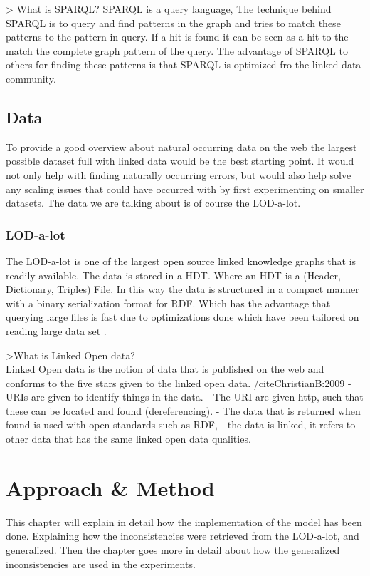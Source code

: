 \documentclass{article}
\begin{document}
> What is SPARQL?
SPARQL is a query language, The technique behind SPARQL is to query and find patterns in the graph and tries to match these patterns to the pattern in query. If a hit is found it can be seen as a hit to the match the complete graph pattern of the query. The advantage of SPARQL to others for finding these patterns is that SPARQL is optimized fro the linked data community.  \cite{SPARQLPrimer:2013}


\subsection{Data}
To provide a good overview about natural occurring data on the web the largest possible dataset full with linked data would be the best starting point. It would not only help with finding naturally occurring errors, but would also help solve any scaling issues that could have occurred with by first experimenting on smaller datasets. The data we are talking about is of course the LOD-a-lot.

\subsubsection{LOD-a-lot}
The LOD-a-lot \cite{JavierD:2017} is one of the largest open source linked knowledge graphs that is readily available. The data is stored in a HDT. Where an HDT is a (Header, Dictionary, Triples) File. In this way the data is structured in a compact manner with a binary serialization format for RDF. Which has the advantage that querying large files is fast due to optimizations done which have been tailored on reading large data set \cite{JavierD:2013}.

>What is Linked Open data?\\
Linked Open data is the notion of data that is published on the web and conforms to the five stars given to the linked open data. /cite{ChristianB:2009}
 - URIs are given to identify things in the data.
 - The URI are given http, such that these can be located and found (dereferencing).
 - The data that is returned when found is used with open standards such as RDF,
 - the data is linked, it refers to other data that has the same linked open data qualities.

\newpage
\section{Approach \& Method}
This chapter will explain in detail how the implementation of the model has been done. Explaining how the inconsistencies were retrieved from the LOD-a-lot, and generalized. Then the chapter goes more in detail about how the generalized inconsistencies are used in the experiments. 
\end{document}
